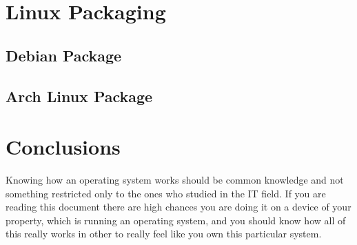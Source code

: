 \documentclass[12pt,a4paper,openright,twoside]{report}
\begin{document}
\chapter{Linux Packaging}
\lhead[\fancyplain{}{\bfseries\thepage}]{\fancyplain{}{\bfseries\rightmark}}
\section{Debian Package}
\section{Arch Linux Package}
\chapter{Conclusions}
\lhead[\fancyplain{}{\bfseries\thepage}]{\fancyplain{}{\bfseries\rightmark}}
Knowing how an operating system works should be common knowledge and not something restricted only to the ones who studied in the IT field.
If you are reading this document there are high chances you are doing it on a device of your property, which is running an operating system, and you should know how all of this really works in other to really feel like you own this particular system.
\end{document}
